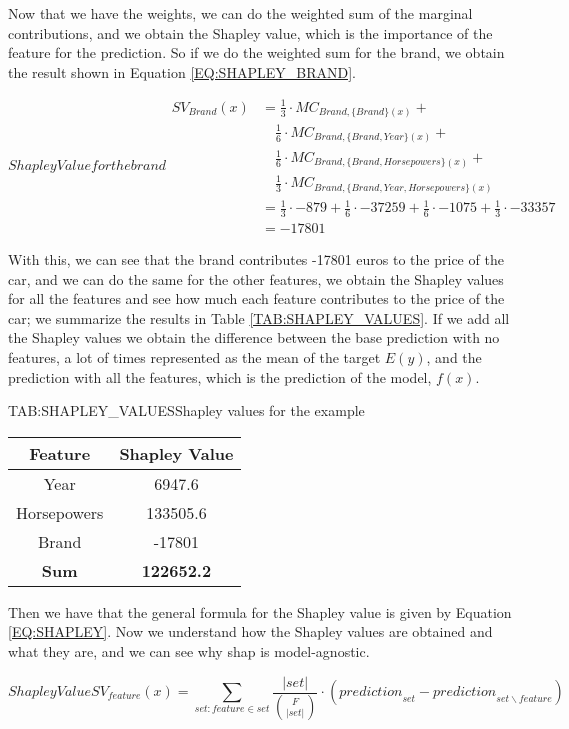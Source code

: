 Now that we have the weights, we can do the weighted sum of the marginal contributions, and we obtain the Shapley value, which is the importance of the feature for the prediction. So if we do the weighted sum for the brand, we obtain the result shown in Equation \ref{EQ:SHAPLEY_BRAND}.

\begin{equation}[EQ:SHAPLEY_BRAND]{Shapley Value for the brand}
    \begin{split}
        SV_{Brand}(x) & = \frac{1}{3} \cdot MC_{Brand, \{Brand\}(x)} + \\ 
        & \quad \frac{1}{6} \cdot MC_{Brand, \{Brand, Year\}(x)} + \\ 
        & \quad \frac{1}{6} \cdot MC_{Brand, \{Brand, Horsepowers\}(x)} + \\ 
        & \quad \frac{1}{3} \cdot MC_{Brand, \{Brand, Year, Horsepowers\}(x)} \\
        & = \frac{1}{3} \cdot -879 + \frac{1}{6} \cdot -37259 + \frac{1}{6} \cdot -1075 + \frac{1}{3} \cdot -33357 \\
        & = -17801
    \end{split}
\end{equation}

With this, we can see that the brand contributes -17801 euros to the price of the car, and we can do the same for the other features, we obtain the Shapley values for all the features and see how much each feature contributes to the price of the car; we summarize the results in Table \ref{TAB:SHAPLEY_VALUES}. If we add all the Shapley values we obtain the difference between the base prediction with no features, a lot of times represented as the mean of the target $E(y)$, and the prediction with all the features, which is the prediction of the model, $f(x)$.
\begin{table}[Shapley Values]{TAB:SHAPLEY_VALUES}{Shapley values for the example}
    \begin{tabular}{|c|c|}
        \hline
        Feature & Shapley Value \\
        \hline
        Year & 6947.6 \\
        Horsepowers & 133505.6 \\
        Brand & -17801 \\
        \hline
        \textbf{Sum} & \textbf{122652.2} \\
        \hline
    \end{tabular}
\end{table}

Then we have that the general formula for the Shapley value is given by Equation \ref{EQ:SHAPLEY}. Now we understand how the Shapley values are obtained and what they are, and we can see why \ac{shap} is model-agnostic. 

\begin{equation}[EQ:SHAPLEY]{Shapley Value}
   \boxed{ SV_{feature}(x) = \sum_{{set:feature} \in {set}} \frac{|{set}| }{{F \choose |{set}|}} \cdot ({prediction}_{set} - {prediction}_{{set} \backslash {feature}})}
\end{equation}